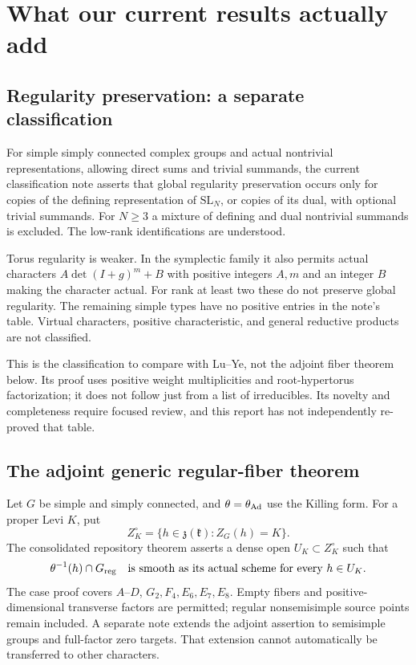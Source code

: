 \section{What our current results actually add}
\subsection{Regularity preservation: a separate classification}

For simple simply connected complex groups and actual nontrivial representations, allowing direct sums and trivial summands, the current classification note asserts that global regularity preservation occurs only for copies of the defining representation of $\mathrm{SL}_N$, or copies of its dual, with optional trivial summands. For $N\ge3$ a mixture of defining and dual nontrivial summands is excluded. The low-rank identifications are understood.

Torus regularity is weaker. In the symplectic family it also permits actual characters $A\det(I+g)^m+B$ with positive integers $A,m$ and an integer $B$ making the character actual. For rank at least two these do not preserve global regularity. The remaining simple types have no positive entries in the note's table. Virtual characters, positive characteristic, and general reductive products are not classified.

This is the classification to compare with Lu--Ye, not the adjoint fiber theorem below. Its proof uses positive weight multiplicities and root-hypertorus factorization; it does not follow just from a list of irreducibles. Its novelty and completeness require focused review, and this report has not independently re-proved that table.

\subsection{The adjoint generic regular-fiber theorem}

Let $G$ be simple and simply connected, and $\theta=\theta_{\operatorname{Ad}}$ use the Killing form. For a proper Levi $K$, put
\[
Z_K^\circ=\{h\in\mathfrak z(\mathfrak k):Z_G(h)=K\}.
\]
The consolidated repository theorem asserts a dense open $U_K\subset Z_K^\circ$ such that
\begin{equation}\label{eq:main}
\theta^{-1}(h)\cap G_{\mathrm{reg}}
\quad\text{is smooth as its actual scheme for every }h\in U_K.
\end{equation}
The case proof covers $A$--$D$, $G_2,F_4,E_6,E_7,E_8$. Empty fibers and positive-dimensional transverse factors are permitted; regular nonsemisimple source points remain included. A separate note extends the adjoint assertion to semisimple groups and full-factor zero targets. That extension cannot automatically be transferred to other characters.

